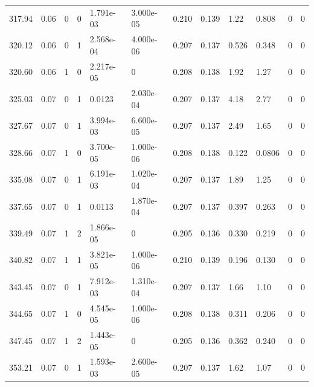 \documentclass[preview]{standalone}
\begin{document}
{{{\begin{tabular}{L{1.2cm}C{1.2cm} C{0.3cm}C{0.5cm} C{1.4cm}C{1.4cm} C{1.4cm}C{1.4cm} C{1.6cm}C{1.6cm} C{1.6cm}C{1.6cm}}
  317.94  &  0.06  & 0     &  0 &  1.791e-03  & 3.000e-05  &  0.210&   0.139& 1.22 & 0.808   &  0 & 0  \\ 
  320.12  &  0.06  & 0     &  1 &  2.568e-04  & 4.000e-06  &  0.207&   0.137& 0.526 & 0.348   &  0 & 0  \\ 
  320.60  &  0.06  & 1     &  0 &  2.217e-05  & 0  &  0.208&   0.138& 1.92 & 1.27   &  0 & 0  \\ 
  325.03  &  0.07  & 0     &  1 &  0.0123  & 2.030e-04  &  0.207&   0.137& 4.18 & 2.77   &  0 & 0  \\ 
  327.67  &  0.07  & 0     &  1 &  3.994e-03  & 6.600e-05  &  0.207&   0.137& 2.49 & 1.65   &  0 & 0  \\ 
  328.66  &  0.07  & 1     &  0 &  3.700e-05  & 1.000e-06  &  0.208&   0.138& 0.122 & 0.0806   &  0 & 0  \\ 
  335.08  &  0.07  & 0     &  1 &  6.191e-03  & 1.020e-04  &  0.207&   0.137& 1.89 & 1.25   &  0 & 0  \\ 
  337.65  &  0.07  & 0     &  1 &  0.0113  & 1.870e-04  &  0.207&   0.137& 0.397 & 0.263   &  0 & 0  \\ 
  339.49  &  0.07  & 1     &  2 &  1.866e-05  & 0  &  0.205&   0.136& 0.330 & 0.219   &  0 & 0  \\ 
  340.82  &  0.07  & 1     &  1 &  3.821e-05  & 1.000e-06  &  0.210&   0.139& 0.196 & 0.130   &  0 & 0  \\ 
  343.45  &  0.07  & 0     &  1 &  7.912e-03  & 1.310e-04  &  0.207&   0.137& 1.66 & 1.10   &  0 & 0  \\ 
  344.65  &  0.07  & 1     &  0 &  4.545e-05  & 1.000e-06  &  0.208&   0.138& 0.311 & 0.206   &  0 & 0  \\ 
  347.45  &  0.07  & 1     &  2 &  1.443e-05  & 0  &  0.205&   0.136& 0.362 & 0.240   &  0 & 0  \\ 
  353.21  &  0.07  & 0     &  1 &  1.593e-03  & 2.600e-05  &  0.207&   0.137& 1.62 & 1.07   &  0 & 0  \\ 
\hline 
\end{tabular} 

}}}
\end{document}
